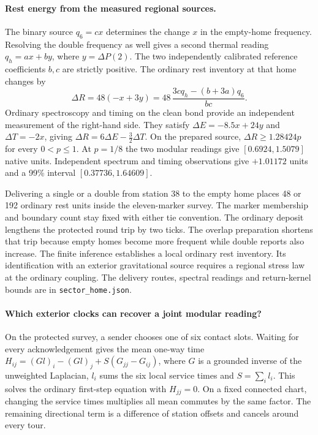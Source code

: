 \documentclass[11pt]{article}
\begin{document}
\paragraph{Rest energy from the measured regional sources.}
The binary source \(q_6=cx\) determines the change \(x\) in the
empty-home frequency. Resolving the double frequency as well gives a
second thermal reading \(q_h=ax+by\), where \(y=\Delta P(2)\).
The two independently calibrated reference coefficients \(b,c\) are
strictly positive. The ordinary rest inventory at that home changes by
\[
  \Delta R=48(-x+3y)=48\,\frac{3c q_h-(b+3a)q_6}{bc}.
\]
Ordinary spectroscopy and timing on the clean bond provide an
independent measurement of the right-hand side. They satisfy
\(\Delta E=-8.5x+24y\) and \(\Delta T=-2x\), giving
\(\Delta R=6\Delta E-\tfrac32\Delta T\). On the prepared source,
\(\Delta R\ge1.28424p\) for every \(0<p\le1\). At \(p=1/8\)
the two modular readings give \([0.6924,1.5079]\) native units.
Independent spectrum and timing observations give \(+1.01172\)
units and a 99\% interval \([0.37736,1.64609]\).

Delivering a single or a double from station 38 to the empty home
places 48 or 192 ordinary rest units inside the eleven-marker survey.
The marker membership and boundary count stay fixed with either
tie convention. The ordinary deposit lengthens the protected round
trip by two ticks. The overlap preparation shortens that trip because
empty homes become more frequent while double reports also increase.
The finite inference establishes a local ordinary rest inventory.
Its identification with an exterior gravitational source requires a
regional stress law at the ordinary coupling. The delivery routes,
spectral readings and return-kernel bounds are in
\texttt{sector\_home.json}.

\paragraph{Which exterior clocks can recover a joint modular reading?}
On the protected survey, a sender chooses one of six contact slots.
Waiting for every acknowledgement gives the mean one-way time
\(H_{ij}=(Gl)_i-(Gl)_j+S(G_{jj}-G_{ij})\), where \(G\) is a
grounded inverse of the unweighted Laplacian, \(l_i\) sums the six
local service times and \(S=\sum_i l_i\). This solves the ordinary
first-step equation with \(H_{jj}=0\). On a fixed connected chart,
changing the service times multiplies all mean commutes by the same
factor. The remaining directional term is a difference of station
offsets and cancels around every tour.
\end{document}
